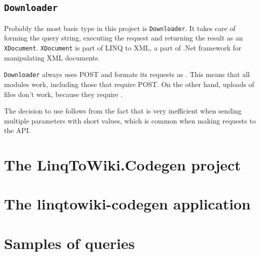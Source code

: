 
\subsection{\texorpdfstring{\lstinline{Downloader}}{Downloader}}

Probably the most basic type in this project is \lstinline{Downloader}.
It takes care of forming the query string, executing the request and
returning the result as an \lstinline{XDocument}.
\lstinline{XDocument} is part of LINQ to XML, a part of .Net framework for manipulating XML documents.

\lstinline{Downloader} always uses POST and formats its requests as .
This means that all modules work, including those that require POST.
On the other hand, uploads of files don't work, because they require .

The decision to use  follows from the fact that
 is very inefficient when sending multiple parameters with short values,
which is common when making requests to the API.


\section{The LinqToWiki.Codegen project}
\label{ltwc}

\section{The linqtowiki-codegen application}

\section{Samples of queries}